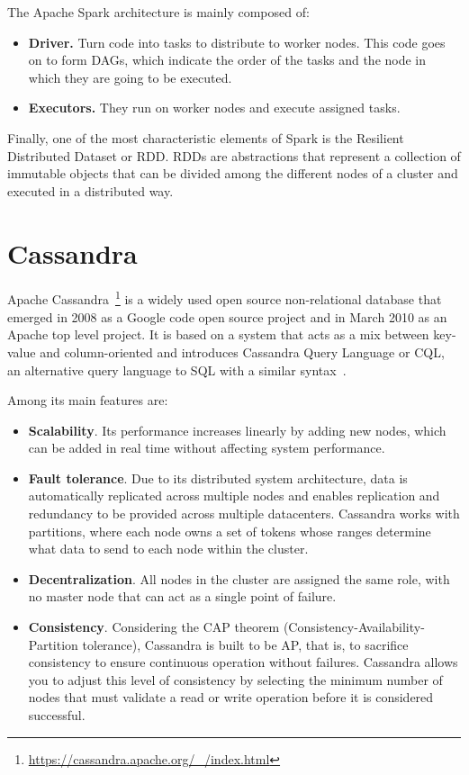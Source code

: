 \nonzeroparskip The Apache Spark architecture is mainly composed of:
\begin{itemize}
	\item \textbf{Driver.} Turn code into tasks to distribute to worker nodes. This code goes on to form DAGs, which indicate the order of the tasks and the node in which they are going to be executed.
	\item \textbf{Executors.} They run on worker nodes and execute assigned tasks.
\end{itemize}

\nonzeroparskip Finally, one of the most characteristic elements of Spark is the Resilient Distributed Dataset or RDD. RDDs are abstractions that represent a collection of immutable objects that can be divided among the different nodes of a cluster and executed in a distributed way.

\section{Cassandra}

\nonzeroparskip Apache Cassandra~\footnote{\url{https://cassandra.apache.org/_/index.html}} is a widely used open source non-relational database that emerged in 2008 as a Google code open source project and in March 2010 as an Apache top level project. It is based on a system that acts as a mix between key-value and column-oriented and introduces Cassandra Query Language or CQL, an alternative query language to SQL with a similar syntax~\cite{cassandra,wikipedia_cassandra}.

\nonzeroparskip Among its main features are:
\begin{itemize}
	\item \textbf{Scalability}. Its performance increases linearly by adding new nodes, which can be added in real time without affecting system performance.
	\item \textbf{Fault tolerance}. Due to its distributed system architecture, data is automatically replicated across multiple nodes and enables replication and redundancy to be provided across multiple datacenters. Cassandra works with partitions, where each node owns a set of tokens whose ranges determine what data to send to each node within the cluster.
	\item \textbf{Decentralization}. All nodes in the cluster are assigned the same role, with no master node that can act as a single point of failure.
	\item \textbf{Consistency}. Considering the CAP theorem (Consistency-Availability-Partition tolerance), Cassandra is built to be AP, that is, to sacrifice consistency to ensure continuous operation without failures. Cassandra allows you to adjust this level of consistency by selecting the minimum number of nodes that must validate a read or write operation before it is considered successful.
\end{itemize}

